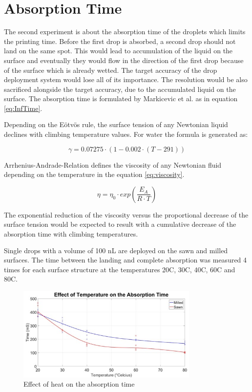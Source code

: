 \section{Absorption Time}
The second experiment is about the absorption time of the droplets which limits the printing time. Before the first drop is absorbed, a second drop should not land on the same spot. This would lead to accumulation of the liquid on the surface and eventually they would flow in the direction of the first drop because of the surface which is already wetted. The target accuracy of the drop deployment system would lose all of its importance. The resolution would be also sacrificed alongside the target accuracy, due to the accumulated liquid on the surface. The absorption time is formulated by Markicevic et al. as in equation \ref{eq:InfTime}.

Depending on the Eötvös rule, the surface tension of any Newtonian liquid declines with climbing temperature values. For water the formula is generated as:

\bigskip

\begin{equation}\label{eq:watergamma}
\gamma =0.07275 \cdotp(1-0.002\cdotp(T-291))
\end{equation}

\bigskip

Arrhenius-Andrade-Relation defines the viscosity of any Newtonian fluid depending on the temperature in the equation \ref{eq:viscosity}.  

\bigskip

\begin{equation}\label{eq:viscosity}
\eta =\eta_0 \cdotp exp(\frac{E_A}{R\cdotp T})
\end{equation}

\bigskip

The exponential reduction of the viscosity  versus the proportional decrease of the surface tension would be expected to result with a cumulative decrease of the absorption time with climbing temperatures.

Single drops with a volume of 100 nL are deployed on the sawn and milled surfaces. The time between the landing and complete absorption was measured 4 times for each surface structure at the temperatures 20\textdegree C, 30\textdegree C, 40\textdegree C, 60\textdegree C and 80\textdegree C.

\bigskip

\begin{figure}[H]
	\centering
	\includegraphics[width=0.8\textwidth]{grafiken/AbsorptionTime.jpg}
	\caption{Effect of heat on the absorption time}
	\label{fig:AbsorptionTime}
\end{figure} 

